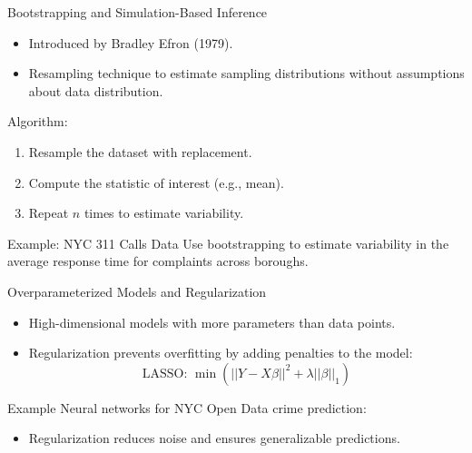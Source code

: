 \documentclass{beamer}
\begin{document}
\begin{frame}{Bootstrapping and Simulation-Based Inference}
\begin{itemize}
    \item Introduced by Bradley Efron (1979).
    \item Resampling technique to estimate sampling distributions without assumptions about data distribution.
\end{itemize}

\begin{exampleblock}{Algorithm:}
\begin{enumerate}
    \item Resample the dataset with replacement.
    \item Compute the statistic of interest (e.g., mean).
    \item Repeat \( n \) times to estimate variability.
\end{enumerate}
\end{exampleblock}

\begin{block}{Example: NYC 311 Calls Data}
Use bootstrapping to estimate variability in the average response time for complaints across boroughs.
\end{block}
\end{frame}

\begin{frame}{Overparameterized Models and Regularization}
\begin{itemize}
    \item High-dimensional models with more parameters than data points.
    \item Regularization prevents overfitting by adding penalties to the model:
    \[
    \text{LASSO: } \min \left( ||Y - X\beta||^2 + \lambda ||\beta||_1 \right)
    \]
\end{itemize}

\begin{block}{Example}
Neural networks for NYC Open Data crime prediction:
\begin{itemize}
    \item Regularization reduces noise and ensures generalizable predictions.
\end{itemize}
\end{block}
\end{frame}
\end{document}

